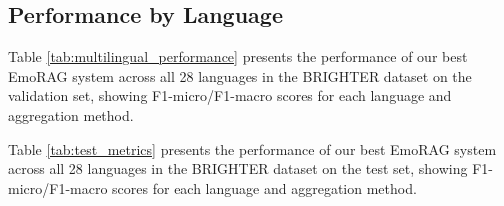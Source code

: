 \documentclass[a4paper,12pt]{extarticle}
\begin{document}
\subsection{Performance by Language}


Table \ref{tab:multilingual_performance} presents the performance of our best EmoRAG system across all 28 languages in the BRIGHTER dataset on the validation set, showing F1-micro/F1-macro scores for each language and aggregation method.

Table \ref{tab:test_metrics} presents the performance of our best EmoRAG system across all 28 languages in the BRIGHTER dataset on the test set, showing F1-micro/F1-macro scores for each language and aggregation method.
\end{document}
